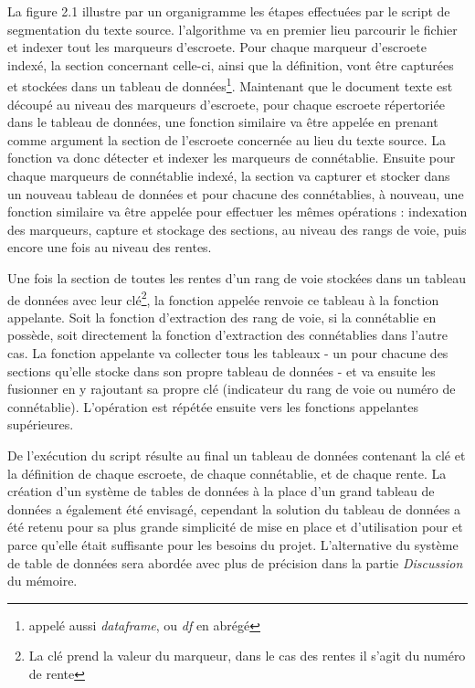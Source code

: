 La figure 2.1 illustre par un organigramme les étapes effectuées par le script de segmentation du texte source.
l'algorithme va en premier lieu parcourir le fichier et indexer tout les marqueurs d'escroete. Pour chaque marqueur d'escroete indexé, la section concernant celle-ci, ainsi que la définition, vont être capturées et stockées dans un tableau de données\footnote{appelé aussi \textit{dataframe}, ou \textit{df} en abrégé}. Maintenant que le document texte est découpé au niveau des marqueurs d'escroete, pour chaque escroete répertoriée dans le tableau de données, une fonction similaire va être appelée  en prenant comme argument la section de l'escroete concernée au lieu du texte source. La fonction va donc détecter et indexer les marqueurs de connétablie. Ensuite pour chaque marqueurs de connétablie indexé, la section va capturer et stocker dans un nouveau  tableau de données et pour chacune des connétablies, à nouveau, une fonction similaire va être appelée pour effectuer les mêmes opérations : indexation des marqueurs, capture et stockage des sections, au niveau des rangs de voie, puis encore une fois au niveau des rentes.

Une fois la section de toutes les rentes d'un rang de voie stockées dans un tableau de données avec leur clé\footnote{
La clé prend la valeur du marqueur, dans le cas des rentes il s'agit du numéro de rente}, la fonction appelée renvoie ce tableau à la fonction appelante. Soit la fonction d'extraction des rang de voie, si la connétablie en possède, soit directement la fonction d'extraction des connétablies dans l'autre cas. La fonction appelante va collecter tous les tableaux - un pour chacune des sections qu'elle stocke dans son propre tableau de données - et va ensuite les fusionner en y rajoutant sa propre clé (indicateur du rang de voie ou numéro de connétablie). L'opération est répétée ensuite vers les fonctions appelantes supérieures.

De l'exécution du script résulte au final un tableau de données contenant la clé et la définition de chaque escroete, de chaque connétablie, et de chaque rente. La création d'un système de tables de données à la place d'un grand tableau de données a également été envisagé, cependant la solution du tableau de données a été retenu pour sa plus grande simplicité de mise en place et d'utilisation pour et parce qu'elle était suffisante pour les besoins du projet. L'alternative du système de table de données sera abordée avec plus de précision  dans la partie \textit{Discussion} du mémoire.


